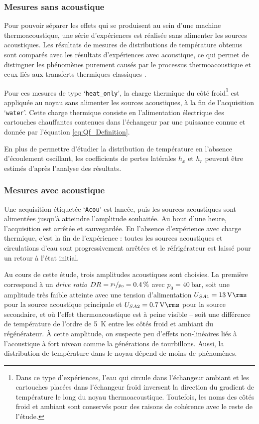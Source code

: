 \subsubsection{Mesures sans acoustique}\label{chap:MesureSansAcou}
Pour pouvoir séparer les effets qui se produisent au sein d'une machine thermoacoustique, une série d'expériences est réalisée sans alimenter les sources acoustiques. Les résultats de mesures de distributions de température obtenus sont comparés avec les résultats d'expériences avec acoustique, ce qui permet de distinguer les phénomènes purement causés par le processus thermoacoustique et ceux liés aux transferts thermiques \og classiques \fg{}.

Pour ces mesures de type `\texttt{heat\_{}only}', la charge thermique du côté \og froid\footnote{Dans ce type d'expériences, l'eau qui circule dans l'échangeur ambiant et les cartouches placées dans l'échangeur froid inversent la direction du gradient de température le long du noyau thermoacoustique. Toutefois, les noms des côtés \og froid \fg{} et \og ambiant \fg{} sont conservés pour des raisons de cohérence avec le reste de l'étude.} \fg{} est appliquée au noyau sans alimenter les sources acoustiques, à la fin de l'acquisition `\texttt{water}'. Cette charge thermique consiste en l'alimentation électrique des cartouches chauffantes contenues dans l'échangeur par une puissance connue et donnée par l'équation \ref{eq:Qf_Definition}.\smallskip

En plus de permettre d'étudier la distribution de température en l'absence d'écoulement oscillant, les coefficients de pertes latérales $h_x$ et $h_r$ peuvent être estimés d'après l'analyse des résultats.


\subsubsection{Mesures avec acoustique}\label{chap:MesureAvecAcou} 
Une acquisition étiquetée `\texttt{Acou}' est lancée, puis les sources acoustiques sont alimentées jusqu'à atteindre l'amplitude souhaitée. Au bout d'une heure, l'acquisition est arrêtée et sauvegardée. En l'absence d'expérience avec charge thermique, c'est la fin de l'expérience : toutes les sources acoustiques et circulations d'eau sont progressivement arrêtées et le réfrigérateur est laissé pour un retour à l'état initial.\medskip

Au cours de cette étude, trois amplitudes acoustiques sont choisies. La première correspond à un \textit{drive ratio} $DR=\nicefrac{p_1}{p_0}=\qty{.4}{\percent}$ avec $p_0=\qty{40}{\bar}$, soit une amplitude très faible atteinte avec une tension d'alimentation $U_{SA1}=\qty{13}{\volt\rms}$ pour la source acoustique principale  et $U_{SA2}=\qty{.7}{\volt\rms}$ pour la source secondaire, et où l'effet thermoacoustique est à peine visible -- soit une différence de température de l'ordre de \qty{5}{\kelvin} entre les côtés froid et ambiant du régénérateur. À cette amplitude, on suspecte peu d'effets non-linéaires liés à l'acoustique à fort niveau comme la générations de tourbillons. Aussi, la distribution de température dans le noyau dépend de moins de phénomènes.\smallskip

